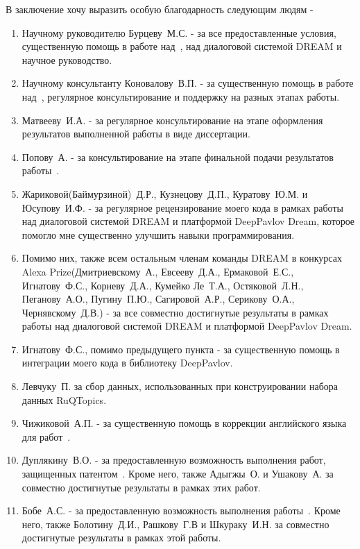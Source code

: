 В заключение хочу выразить особую благодарность следующим людям - 
\begin{enumerate}
\item Научному руководителю Бурцеву~М.\:С. - за все предоставленные условия, существенную помощь в работе над~\cite{dream1,dream1_trudy,dream2,pseudolabel,mtldream}, над диалоговой системой DREAM и научное руководство.
\item Научному консультанту Коновалову~В.\:П. - за существенную помощь в работе над~\cite{rumtl,rutopics}, регулярное консультирование и поддержку на разных этапах работы.
\item Матвееву~И.\:А. - за регулярное консультирование на этапе оформления результатов выполненной работы в виде диссертации.
\item Попову~А. - за консультирование на этапе финальной подачи результатов работы~\cite{rutopics}.
\item Жариковой(Баймурзиной)~Д.\:Р., Кузнецову~Д.\:П., Куратову~Ю.\:М. и Юсупову~И.\:Ф. - за регулярное рецензирование моего кода в рамках работы над диалоговой системой DREAM и платформой DeepPavlov Dream, которое помогло мне существенно улучшить навыки программирования.
\item Помимо них, также всем остальным членам команды DREAM в конкурсах Alexa Prize(Дмитриевскому~А., Евсееву~Д.\:А., Ермаковой~Е.\:С., Игнатову~Ф.\:С., Корневу~Д.\:А., Кумейко Ле~Т.\:А., Остяковой~Л.\:Н., Пеганову~А.\:О., Пугину~П.\:Ю., Сагировой~А.\:Р., Серикову~О.\:А., Чернявскому~Д.\:В.) - за все совместно достигнутые результаты в рамках работы над диалоговой системой DREAM и платформой DeepPavlov Dream.
\item Игнатову~Ф.\:С., помимо предыдущего пункта - за существенную помощь в интеграции моего кода в библиотеку DeepPavlov.
\item Левчуку~П. за сбор данных, использованных при конструировании набора данных RuQTopics.
\item Чижиковой~А.\:П. - за существенную помощь в коррекции английского языка для работ~\cite{rumtl,rutopics}.
\item Дуплякину~В.\:О. - за предоставленную возможность выполнения работ, защищенных патентом~\cite{Дуплякин_Дмитрий_Ондар_Ушаков_2021}. Кроме него, также Адыгжы~\:О. и Ушакову~\:А. за совместно достигнутые результаты в рамках этих работ. 
\item Бобе~А.\:С. - за предоставленную возможность выполнения работы~\cite{Болотин_Карпов_Рашков_Шкурак_2019}. Кроме него, также Болотину~Д.\:И., Рашкову~Г.\:В и Шкураку~И.\:Н. за совместно достигнутые результаты в рамках этой работы. 

\end{enumerate}
